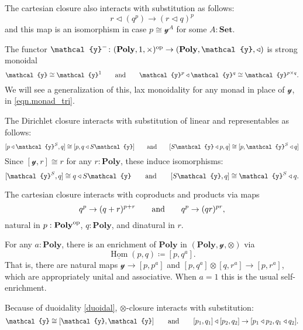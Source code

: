 \documentclass[11pt, one side, article]{memoir}
\theoremstyle{definition}
\theoremstyle{plain}
\DeclareMathOperator{\Hom}{Hom}
\newcommand{\Cat}[1]{\mathbf{#1}}%
\newcommand{\op}{^\tn{op}}
\newcommand{\tn}[1]{\textnormal{#1}}
\newcommand{\ul}[1]{\underline{#1}}
\newcommand{\smset}{\Cat{Set}}
\newcommand{\yon}{{\mathcal{y}}}
\newcommand{\poly}{\Cat{Poly}}
\newcommand{\0}{\textsf{0}}
\newcommand{\1}{\tn{\textsf{1}}}
\newcommand{\tri}{\mathbin{\triangleleft}}
\newcommand{\hh}[2][]{#1 \tn{#2} #1}
\newcommand{\qqand}{\hh[\qquad]{and}}
\begin{document}
The cartesian closure also interacts with substitution as follows:
\begin{equation}
	r\tri (q^p)\to (r\tri q)^p
\end{equation}
and this map is an isomorphism in case $p\cong\yon^A$ for some $A:\smset$. 

The functor $\yon^-\colon(\poly,1,\times)\op\to(\poly,\yon,\tri)$ is strong monoidal
\begin{equation}
	\yon\cong\yon^1
	\qqand
	\yon^p\tri\yon^q\cong\yon^{p\times q}.
\end{equation}
We will see a generalization of this, lax monoidality for any monad in place of $\yon$, in \eqref{eqn.monad_tri}.

The Dirichlet closure interacts with substitution of linear and representables as follows:
\begin{equation}\label{eqn.innerhom_adj}
  [p\tri \yon^S,q]\cong[p,q\tri S\yon]
  \qqand
  [S\yon\tri p,q]\cong[p,\yon^S\tri q]
\end{equation}
Since $[\yon,r]\cong r$ for any $r:\poly$, these induce isomorphisms:
\begin{equation}\label{eqn.closure_lin_rep}
	[\yon^S,q]\cong q\tri S\yon
	\qqand
	[S\yon,q]\cong\yon^S\tri q.
\end{equation} 

The cartesian closure interacts with coproducts and products via maps
\begin{equation}
  q^p\to(q+r)^{p+r}
  \qqand
	q^p\to(qr)^{pr},
\end{equation}
natural in $p:\poly\op$, $q:\poly$, and dinatural in $r$.

For any $a:\poly$, there is an enrichment of $\poly$ in $(\poly,\yon,\otimes)$ via
\begin{equation}
	\ul\Hom(p,q)\coloneqq[p,q^a].
\end{equation}
That is, there are natural maps $\yon\to[p,p^a]$ and $[p,q^a]\otimes[q,r^a]\to[p,r^a]$, which are appropriately unital and associative. When $a=1$ this is the usual self-enrichment.


Because of duoidality \eqref{duoidal}, $\otimes$-closure interacts with substitution:
\begin{equation}\label{eqn.shapiro_1}
	\yon\cong[\yon,\yon]
	\qqand
	[p_1,q_1]\tri[p_2,q_2]\to [p_1\tri p_2,q_1\tri q_2].
\end{equation}
\end{document}
